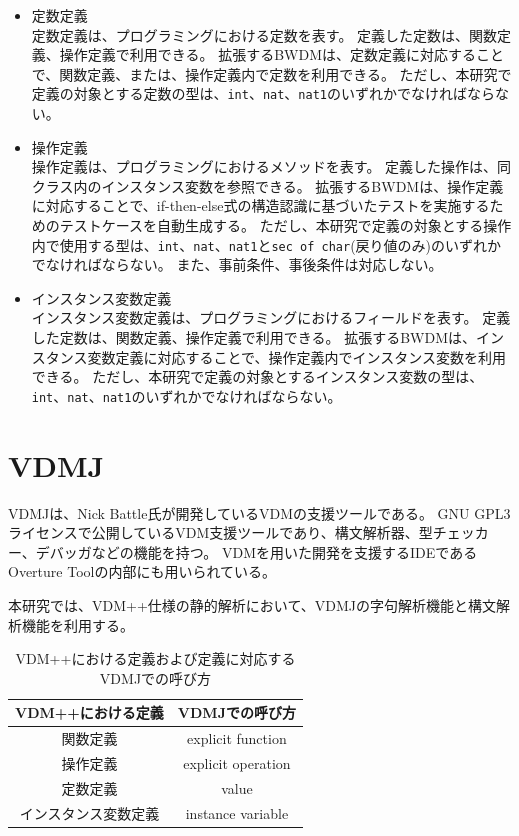 \documentclass[uplatex, report, a4j, 10pt]{jsbook}
\newcommand\ttt[1]{\texttt{#1}}
\begin{document}
\begin{itemize}
  \item 定数定義\\
        定数定義は、プログラミングにおける定数を表す。
        定義した定数は、関数定義、操作定義で利用できる。
        拡張するBWDMは、定数定義に対応することで、関数定義、または、操作定義内で定数を利用できる。
        ただし、本研究で定義の対象とする定数の型は、\ttt{int}、\ttt{nat}、\ttt{nat1}のいずれかでなければならない。
  \item 操作定義\\
        操作定義は、プログラミングにおけるメソッドを表す。
        定義した操作は、同クラス内のインスタンス変数を参照できる。
        拡張するBWDMは、操作定義に対応することで、if-then-else式の構造認識に基づいたテストを実施するためのテストケースを自動生成する。
        ただし、本研究で定義の対象とする操作内で使用する型は、\ttt{int}、\ttt{nat}、\ttt{nat1}と\ttt{sec of char}(戻り値のみ)のいずれかでなければならない。
        また、事前条件、事後条件は対応しない。
  \item インスタンス変数定義\\
        インスタンス変数定義は、プログラミングにおけるフィールドを表す。
        定義した定数は、関数定義、操作定義で利用できる。
        拡張するBWDMは、インスタンス変数定義に対応することで、操作定義内でインスタンス変数を利用できる。
        ただし、本研究で定義の対象とするインスタンス変数の型は、\ttt{int}、\ttt{nat}、\ttt{nat1}のいずれかでなければならない。
\end{itemize}

\section{VDMJ}\label{sec:vdmj}
VDMJ\cite{vdmj}は、Nick Battle氏が開発しているVDMの支援ツールである。
GNU GPL3ライセンスで公開しているVDM支援ツールであり、構文解析器、型チェッカー、デバッガなどの機能を持つ。
VDMを用いた開発を支援するIDEであるOverture Tool\cite{overture}の内部にも用いられている。

本研究では、VDM++仕様の静的解析において、VDMJの字句解析機能と構文解析機能を利用する。

\begin{table}[t]
  \begin{center}
    \caption{VDM++における定義および定義に対応するVDMJでの呼び方}
    \label{tab:vdmj_definition_name}
    \begin{tabular}{c|c}
      VDM++における定義    & VDMJでの呼び方     \\
      \hline
      \hline
      関数定義             & explicit function  \\ \hline
      操作定義             & explicit operation \\ \hline
      定数定義             & value              \\ \hline
      インスタンス変数定義 & instance variable
    \end{tabular}
  \end{center}
\end{table}
\end{document}
